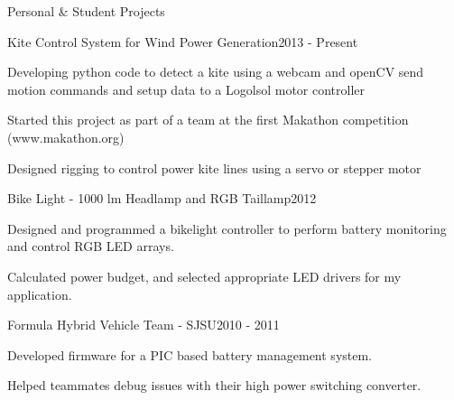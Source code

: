 \documentclass{resume} %
\begin{document}
\pagebreak[3]
\begin{rSection}{Personal \& Student Projects}

\vspace{-0.5em}
\begin{rProject}{Kite Control System for Wind Power Generation}{2013 - Present}
\item Developing python code to detect a kite using a webcam and openCV send motion commands and setup data to a Logolsol motor controller
\item Started this project as part of a team at the first Makathon competition (www.makathon.org)
\item Designed rigging to control power kite lines using a servo or stepper motor
\end{rProject}

\vspace{-0.5em}
\begin{rProject}{Bike Light - 1000 lm Headlamp and RGB Taillamp}{2012}
\item Designed and programmed a bikelight controller to perform battery monitoring and control RGB LED arrays.
\item Calculated power budget, and selected appropriate LED drivers for my application.
\end{rProject}
\vspace{-0.5em}

\begin{rProject}{Formula Hybrid Vehicle Team - SJSU}{2010 - 2011}
\item Developed firmware for a PIC based battery management system.
\item Helped teammates debug issues with their high power switching converter.
\end{rProject}
\end{rSection}
\end{document}
